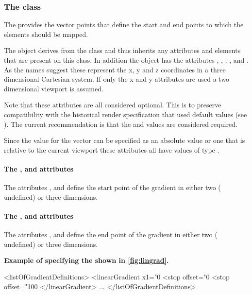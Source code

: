 \subsubsection{The  class}
\label{lineargradient-class}

The \LinearGradient provides the vector points that define the start and end points to which the \GradientStop elements should be mapped.

The \LinearGradient object derives from the \GradientBase class and thus
inherits any attributes and elements that are present on this class.
In addition the \LinearGradient object has the attributes  , ,
, ,  and . As the names suggest these represent the x, y and z coordinates in a three dimensional Cartesian system. If only the x and y attributes are used a two dimensional viewport is assumed.

Note that these attributes are all considered optional. This is to preserve compatibility with the historical render specification that used default values (see ). The current recommendation is that the  and  values are considered required.

Since the value for the vector can be specified as an absolute value or one that is relative to the current viewport these attributes all have values of type \RelAbsVector.

\paragraph{The \fixttspace{}, \fixttspace{} and \fixttspace{} attributes}

The attributes ,  and  define the start point of the gradient in either two ( undefined) or three dimensions.

\paragraph{The \fixttspace{}, \fixttspace{} and \fixttspace{} attributes}

The attributes ,  and  define the end point of the gradient in either two ( undefined) or three dimensions.



{
  {\bf
Example of specifying the \LinearGradient shown in \ref{fig:lingrad}. 
}
}
{\footnotesize
\begin{example}
<listOfGradientDefinitions>
  <linearGradient x1="0%
    <stop offset="0%
    <stop offset="100%
  </linearGradient>
        ...
</listOfGradientDefinitions>
\end{example}
}

